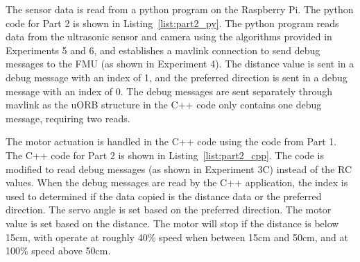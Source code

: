 The sensor data is read from a python program on the Raspberry Pi. The python code for Part 2 is shown in Listing~\ref{list:part2_py}. The python program reads data from the ultrasonic sensor and camera using the algorithms provided in Experiments 5 and 6, and establishes a mavlink connection to send debug messages to the FMU (as shown in Experiment 4). The distance value is sent in a debug message with an index of 1, and the preferred direction is sent in a debug message with an index of 0. The debug messages are sent separately through mavlink as the uORB structure in the C++ code only contains one debug message, requiring two reads.



The motor actuation is handled in the C++ code using the code from Part 1. The C++ code for Part 2 is shown in Listing~\ref{list:part2_cpp}.  The code is modified to read debug messages (as shown in Experiment 3C) instead of the RC values. When the debug messages are read by the C++ application, the index is used to determined if the data copied is the distance data or the preferred direction. The servo angle is set based on the preferred direction. The motor value is set based on the distance. The motor will stop if the distance is below 15cm, with operate at roughly 40\% speed when between 15cm and 50cm, and at 100\% speed above 50cm.

